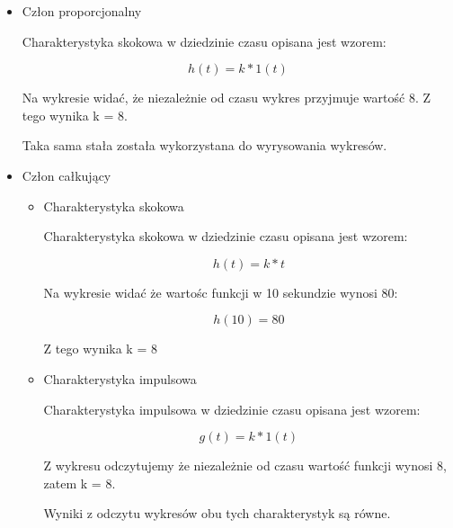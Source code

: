 \documentclass[a4paper,10pt]{article}
\begin{document}
\begin{itemize}
	\item Człon proporcjonalny
		
		Charakterystyka skokowa w dziedzinie czasu opisana jest wzorem:
		
		\begin{equation}
		h(t) = k * 1(t)
		\end{equation}
		
		Na wykresie widać, że niezależnie od czasu wykres przyjmuje wartość 8. Z tego wynika k = 8.
		
		Taka sama stała została wykorzystana do wyrysowania wykresów.
		
	\item Człon całkujący
	
	\begin{itemize}
		\item Charakterystyka skokowa
		
	Charakterystyka skokowa w dziedzinie czasu opisana jest wzorem:
	
\begin{equation}
h(t) = k * t
\end{equation}

Na wykresie widać że wartośc funkcji w 10 sekundzie wynosi 80:

\begin{equation}
h(10) = 80
\end{equation}

Z tego wynika k = 8

\item Charakterystyka impulsowa

Charakterystyka impulsowa w dziedzinie czasu opisana jest wzorem:

\begin{equation}
g(t) = k * 1(t)
\end{equation}

Z wykresu odczytujemy że niezależnie od czasu wartość funkcji wynosi 8, zatem k = 8.

Wyniki z odczytu wykresów obu tych charakterystyk są równe.

\end{itemize}
\end{itemize}
\end{document}
